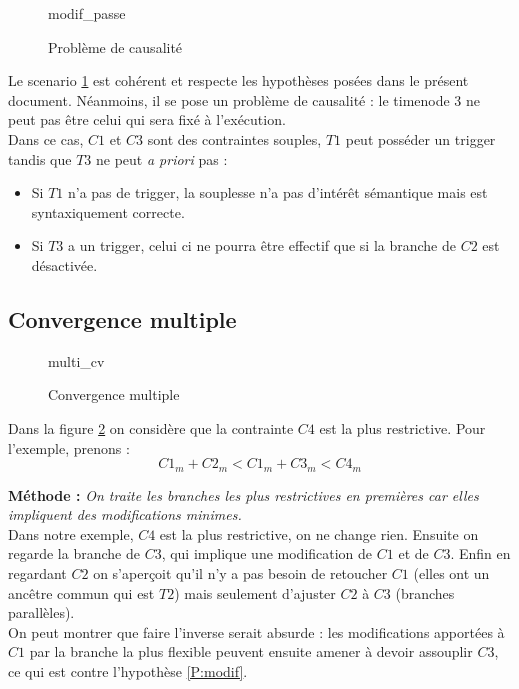 \documentclass[10pt,a4paper]{article}
\newcommand{\hyporef}[1]{l'hypothèse \ref{#1}}
\newcommand*{\TikzPath}{../Algo/PropagationTIKZ}%
\begin{document}
	\begin{figure}[htp]
		\centering
		
		\schemaScenario modif_passe
		\caption{Problème de causalité}
		\label{S:modif_passe}
	\end{figure}

Le scenario \ref{S:modif_passe} est cohérent et respecte les hypothèses posées dans le présent document. Néanmoins, il se pose un problème de causalité : le timenode 3 ne peut pas être celui qui sera fixé à l'exécution. \\
Dans ce cas, $C1$ et $C3$ sont des contraintes souples, $T1$ peut posséder un trigger tandis que $T3$ ne peut \textit{a priori} pas :
	\begin{itemize}
		\item Si $T1$ n'a pas de trigger, la souplesse n'a pas d'intérêt sémantique mais est syntaxiquement correcte.
		\item Si $T3$ a un trigger, celui ci ne pourra être effectif que si la branche de $C2$ est désactivée.
	\end{itemize} 
	
	\subsection{Convergence multiple}

	\begin{figure}[htp]
		\centering
		
		\schemaScenario multi_cv
		\caption{Convergence multiple}
		\label{S:multi_cv}
	\end{figure}
Dans la figure \ref{S:multi_cv} on considère que la contrainte $C4$ est la plus restrictive. Pour l'exemple, prenons :
	\begin{equation}
	\label{E:cv:ordre}
		C1_m + C2_m < C1_m + C3_m < C4_m
	\end{equation}

	\textbf{Méthode :}
	\textit{On traite les branches les plus restrictives en premières car elles impliquent des modifications minimes.} \\
	
Dans notre exemple, $C4$ est la plus restrictive, on ne change rien. Ensuite on regarde la branche de $C3$, qui implique une modification de $C1$ et de $C3$. Enfin en regardant $C2$ on s'aperçoit qu'il n'y a pas besoin de retoucher $C1$ (elles ont un ancêtre commun qui est $T2$) mais seulement d'ajuster $C2$ à $C3$ (branches parallèles). \\
On peut montrer que faire l'inverse serait absurde : les modifications apportées à $C1$ par la branche la plus flexible peuvent ensuite amener à devoir assouplir $C3$, ce qui est contre \hyporef{P:modif}.\\
\end{document}
